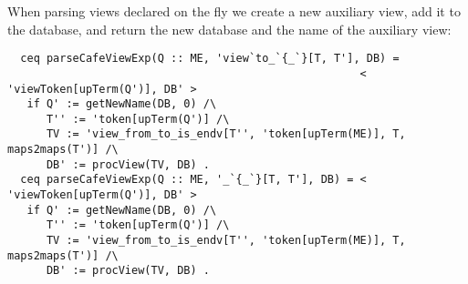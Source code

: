When parsing views declared on the fly we create a new auxiliary view, add it to the
database, and return the new database and the name of the auxiliary view:

{\codesize
\begin{verbatim}
  ceq parseCafeViewExp(Q :: ME, 'view`to_`{_`}[T, T'], DB) =
                                                      < 'viewToken[upTerm(Q')], DB' >
   if Q' := getNewName(DB, 0) /\
      T'' := 'token[upTerm(Q')] /\
      TV := 'view_from_to_is_endv[T'', 'token[upTerm(ME)], T, maps2maps(T')] /\
      DB' := procView(TV, DB) .
  ceq parseCafeViewExp(Q :: ME, '_`{_`}[T, T'], DB) = < 'viewToken[upTerm(Q')], DB' >
   if Q' := getNewName(DB, 0) /\
      T'' := 'token[upTerm(Q')] /\
      TV := 'view_from_to_is_endv[T'', 'token[upTerm(ME)], T, maps2maps(T')] /\
      DB' := procView(TV, DB) .
\end{verbatim}
}

